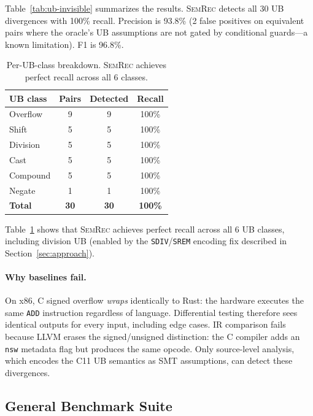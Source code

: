 \documentclass[10pt,a4paper]{article}
\begin{document}
Table~\ref{tab:ub-invisible} summarizes the results.  \textsc{SemRec}
detects all 30 UB divergences with 100\% recall.  Precision is 93.8\%
(2 false positives on equivalent pairs where the oracle's UB
assumptions are not gated by conditional guards---a known limitation).
F1 is 96.8\%.

\begin{table}[t]
\centering
\small
\caption{Per-UB-class breakdown.  \textsc{SemRec} achieves perfect
recall across all 6 classes.}
\label{tab:ub-class}
\begin{tabular}{@{}lccc@{}}
\toprule
UB class & Pairs & Detected & Recall \\
\midrule
Overflow    & 9 & 9 & 100\% \\
Shift       & 5 & 5 & 100\% \\
Division    & 5 & 5 & 100\% \\
Cast        & 5 & 5 & 100\% \\
Compound    & 5 & 5 & 100\% \\
Negate      & 1 & 1 & 100\% \\
\midrule
\textbf{Total} & \textbf{30} & \textbf{30} & \textbf{100\%} \\
\bottomrule
\end{tabular}
\end{table}

Table~\ref{tab:ub-class} shows that \textsc{SemRec} achieves perfect
recall across all 6 UB classes, including division UB (enabled by
the \texttt{SDIV}/\texttt{SREM} encoding fix described in
Section~\ref{sec:approach}).

\paragraph{Why baselines fail.}
On x86, C signed overflow \emph{wraps} identically to Rust: the
hardware executes the same \texttt{ADD} instruction regardless of
language.  Differential testing therefore sees identical outputs for
every input, including edge cases.  IR comparison fails because LLVM
erases the signed/unsigned distinction: the C compiler adds an
\texttt{nsw} metadata flag but produces the same opcode.  Only
source-level analysis, which encodes the C11 UB semantics as SMT
assumptions, can detect these divergences.

\subsection{General Benchmark Suite}\label{sec:benchmark}
\end{document}
